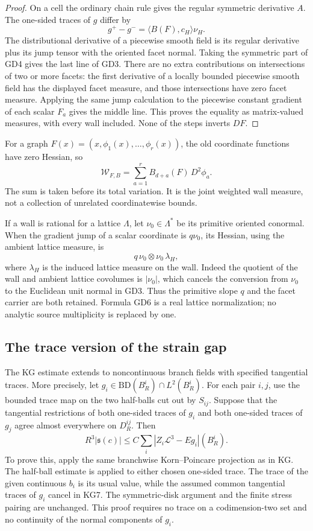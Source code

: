 \begin{proof}
On a cell the ordinary chain rule gives the regular symmetric
derivative \(A\).  The one-sided traces of \(g\) differ by
\[
             g^+-g^-=\langle B(F),c_H\rangle\nu_H.
 \tag{GD4}
\]
The distributional derivative of a piecewise smooth field is
its regular derivative plus its jump tensor with the oriented
facet normal.  Taking the symmetric part of GD4 gives the
last line of GD3.  There are no extra contributions on
intersections of two or more facets: the first derivative of
a locally bounded piecewise smooth field has the displayed
facet measure, and those intersections have zero facet
measure.  Applying the same jump calculation to the
piecewise constant gradient of each scalar \(F_a\) gives
the middle line.  This proves the equality as matrix-valued
measures, with every wall included.  None of the steps
inverts \(DF\).
\end{proof}

For a graph \(F(x)=(x,\phi_1(x),\ldots,\phi_r(x))\),
the old coordinate functions have zero Hessian, so
\[
       \mathcal W_{F,B}
           =\sum_{a=1}^r B_{d+a}(F)\,D^2\phi_a.
 \tag{GD5}
\]
The sum is taken before its total variation.  It is the
joint weighted wall measure, not a collection of unrelated
coordinatewise bounds.

If a wall is rational for a lattice \(\Lambda\), let
\(\nu_0\in\Lambda^*\) be its primitive oriented conormal.
When the gradient jump of a scalar coordinate is
\(q\nu_0\), its Hessian, using the ambient lattice measure,
is
\[
                    q\,\nu_0\otimes\nu_0\,\lambda_H,
 \tag{GD6}
\]
where \(\lambda_H\) is the induced lattice measure on the
wall.  Indeed the quotient of the wall and ambient lattice
covolumes is \(|\nu_0|\), which cancels the conversion
from \(\nu_0\) to the Euclidean unit normal in GD3.
Thus the primitive slope \(q\) and the facet carrier are
both retained.  Formula GD6 is a real lattice normalization;
no analytic source multiplicity is replaced by one.

\subsection{The trace version of the strain gap}

The KG estimate extends to noncontinuous branch fields with
specified tangential traces.  More precisely, let
\(g_i\in\mathrm{BD}(B_R^i)\cap L^2(B_R^i)\).  For each pair \(i,j\),
use the bounded trace map on the two half-balls cut out by
\(S_{ij}\).  Suppose that the tangential restrictions of
both one-sided traces of \(g_i\) and both one-sided traces
of \(g_j\) agree almost everywhere on \(D_R^{ij}\).
Then
\[
 R^3|\mathfrak s(c)|\leq
         C\sum_i|Z_i\mathcal L^3-Eg_i|(B_R^i).
 \tag{GD7}
\]
To prove this, apply the same branchwise Korn--Poincare
projection as in KG.  The half-ball estimate is applied
to either chosen one-sided trace.  The trace of the given
continuous \(b_i\) is its usual value, while the assumed
common tangential traces of \(g_i\) cancel in KG7.  The
symmetric-disk argument and the finite stress pairing are
unchanged.  This proof requires no trace on a codimension-two
set and no continuity of the normal components of \(g_i\).

